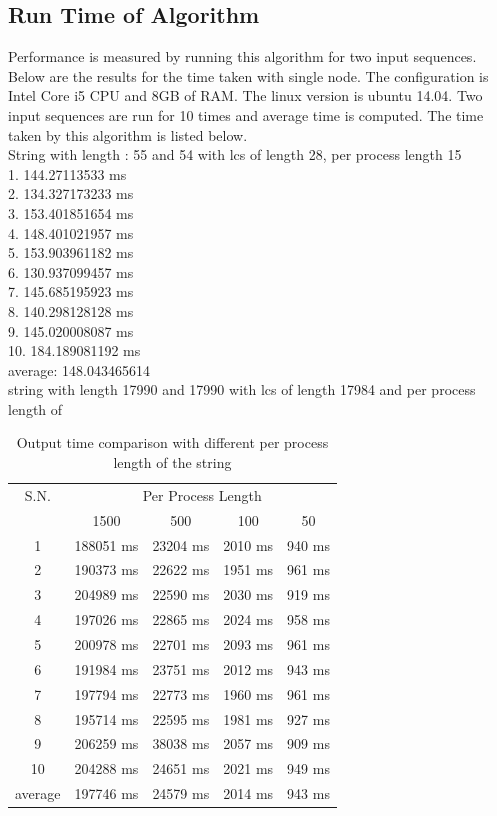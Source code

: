 \documentclass[journal,twoside]{IEEEtran}
\begin{document}
\subsection{Run Time of Algorithm}
Performance is measured by running this algorithm for two input sequences. Below are the results for the time taken with single node. The configuration is Intel Core i5 CPU and 8GB of RAM. The linux version is ubuntu 14.04. Two input sequences are run  for 10 times and average time is computed. The time taken by this algorithm is listed below. 
\\
String with length : 55 and 54 with lcs of length 28, per process length 15\\
1. 144.27113533  ms\\
2. 134.327173233  ms\\
3. 153.401851654  ms\\
4. 148.401021957  ms\\
5. 153.903961182  ms\\
6. 130.937099457  ms\\
7. 145.685195923  ms\\
8. 140.298128128  ms\\
9. 145.020008087  ms\\
10. 184.189081192  ms\\
average:  148.043465614\\

string with length 17990 and 17990 with lcs of length 17984 and per process length of

\begin{table}[h]
\caption{Output time comparison with different per process length of the string}
\begin{center}
    \begin{tabular}{| c | c | c | c | c| }
    \hline
\multirow{}{}{S.N.} & \multicolumn{4}{|c|}{Per Process Length} \\ \cline{2-5}
& 1500 & 500  & 100 & 50 \\ \hline
1 & 188051 ms & 23204 ms & 2010 ms & 940 ms \\ \hline
2 & 190373 ms & 22622 ms & 1951 ms & 961 ms \\ \hline
3 & 204989 ms & 22590 ms & 2030 ms & 919 ms  \\ \hline
4 & 197026 ms & 22865 ms & 2024 ms & 958 ms  \\ \hline
5 & 200978 ms & 22701 ms & 2093 ms & 961 ms  \\ \hline
6 & 191984 ms & 23751 ms & 2012 ms & 943 ms \\ \hline
7 & 197794 ms & 22773 ms & 1960 ms &  961 ms  \\ \hline
8 & 195714 ms & 22595 ms & 1981 ms & 927 ms  \\ \hline
9 & 206259 ms & 38038 ms & 2057 ms & 909 ms \\ \hline
10 & 204288 ms & 24651 ms & 2021 ms & 949 ms \\ \hline
average & 197746 ms & 24579 ms & 2014 ms & 943 ms \\ \hline
\end{tabular}
\end{center}
\label{tab:lcs}
\end{table}
\end{document}

